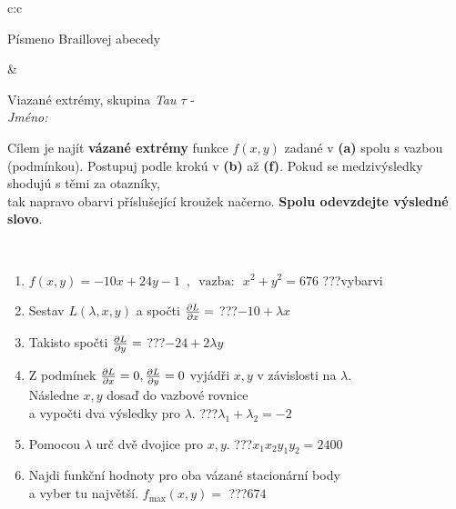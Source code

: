 \documentclass[10pt]{report}
\begin{document}
\begin{tabular}{c:c}
\begin{minipage}[c][104.5mm][t]{0.5\linewidth}
\begin{center}
\begin{minipage}{0.20\linewidth}
\begin{center}
{\small Písmeno Braillovej abecedy}
\end{center}
\end{minipage}
\end{center}
\end{minipage}
&
\begin{minipage}[c][104.5mm][t]{0.5\linewidth}
\begin{center}
\vspace{7mm}
{\huge Viazané extrémy, skupina \textit{Tau $\tau$} -}\\[5mm]
\textit{Jméno:}\phantom{xxxxxxxxxxxxxxxxxxxxxxxxxxxxxxxxxxxxxxxxxxxxxxxxxxxxxxxxxxxxxxxxx}\\[5mm]
\begin{minipage}{0.95\linewidth}
\begin{center}
Cílem je najít \textbf{vázané extrémy} funkce $f(x,y)$ zadané v \textbf{(a)} spolu s vazbou (podmínkou). Postupuj podle krokú v \textbf{(b)} až \textbf{(f)}. Pokud se medzivýsledky shodujú s těmi za otazníky,\\tak napravo obarvi příslušející kroužek načerno. \textbf{Spolu odevzdejte výsledné slovo}.
\end{center}
\end{minipage}
\\[1mm]
\begin{minipage}{0.79\linewidth}
\begin{center}
\begin{varwidth}{\linewidth}
\begin{enumerate}
\normalsize
\item $f(x,y)=-10x+24y-1 \enspace , \enspace \mathrm{vazba:} \enspace x^2+y^2=676$\quad \dotfill\; ???\;\dotfill \quad vybarvi
\item Sestav $L(\lambda,x,y)$ a spočti $\pdv{L}{x}=$\quad \dotfill\; ???\;\dotfill \quad $-10+\lambda x$
\item Takisto spočti $\pdv{L}{y}=$\quad \dotfill\; ???\;\dotfill \quad $-24+2\lambda y$
\item Z podmínek $\pdv{L}{x}=0 , \pdv{L}{y}=0$ vyjádři $x,y$ v závislosti na $\lambda$.\\ \phantom{xxxxxx}Následne $x,y$ dosaď do vazbové rovnice\\ \phantom{xxxxxx}a vypočti dva výsledky pro $\lambda$.\quad \dotfill\; ???\;\dotfill \quad $\lambda_1+\lambda_2=-2$
\item Pomocou $\lambda$ urč dvě dvojice pro $x,y$.\quad \dotfill\; ???\;\dotfill \quad $x_1 x_2 y_1 y_2=2400$
\item Najdi funkční hodnoty pro oba vázané stacionární body\\ \phantom{xxxxxx}a vyber tu najvětší. $f_{\text{max}}(x,y)=$\quad \dotfill\; ???\;\dotfill \quad $674$

\end{enumerate}
\end{varwidth}
\end{center}
\end{minipage}
\end{center}
\end{minipage}
\end{tabular}
\end{document}
